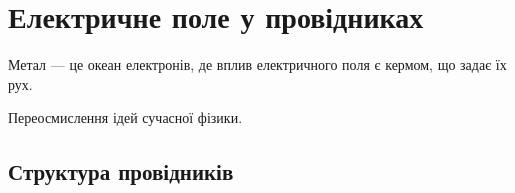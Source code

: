 
\chapter{Електричне поле у провідниках}\label{\currfilebase}
\graphicspath{{\currfilebase/Pictures}}
\epigraph{\Alexander  Метал --- це океан електронів, де вплив електричного поля є кермом, що задає їх рух.
}{Переосмислення ідей сучасної фізики.}


\section{Структура провідників}



